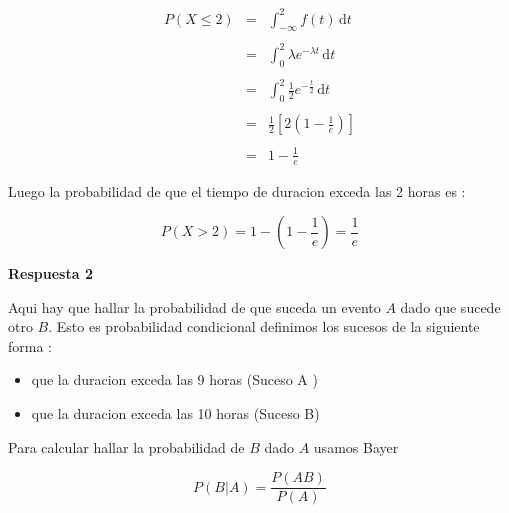 \documentclass{article}
\begin{document}
\begin{flushleft}
        \begin{equation*}
            \begin{array}{rcl}
                P \left(X \le 2 \right) & = & \int_{ - \infty   }^{2}  f\left(t\right)\,\mathrm{d}t
                \\\\
                                        & = & \int_{0 }^{2}  \lambda e^{- \lambda t}\,\mathrm{d}t
                \\\\
                                        & = & \int_{0 }^{2}  \frac{1}{2} e^{- \frac{t}{2} }\,\mathrm{d}t
                \\\\
                                        & = & \frac{1}{2} \left[2 \left(1-\frac{1}{e}\right)\right]
                \\\\
                                        & = & 1 - \frac{1}{e}
            \end{array}
        \end{equation*}
        

        Luego la probabilidad de que el tiempo de duracion exceda las 2 horas es : 

        \begin{equation*}
            P \left(X > 2 \right) = 1 - \left(1 - \frac{1}{e}\right)  = \frac{1}{e} 
        \end{equation*}


        {\bf Respuesta 2 } 

        Aqui hay que hallar la probabilidad de que suceda un evento $A$ dado que sucede otro $B$.
        Esto es probabilidad condicional definimos los sucesos de la siguiente forma :

        \begin{itemize}
            \item que la duracion exceda las 9 horas (Suceso A )
            \item que la duracion exceda las 10 horas (Suceso B)
        \end{itemize}
        
        Para calcular hallar la probabilidad de $B$ dado $A$ usamos Bayer
        
        \begin{equation*}
            P \left(B | A  \right) = \frac{P \left(AB\right)}{P\left(A\right)}
        \end{equation*}


\end{flushleft}
\end{document}
